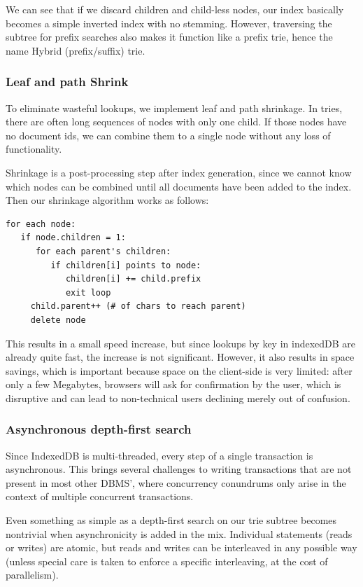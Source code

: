 \documentclass{vldb}
\begin{document}
We can see that if we discard children and child-less nodes, our index basically becomes a simple inverted index with no stemming. However, traversing the subtree for prefix searches also makes it function like a prefix trie, hence the name Hybrid (prefix/suffix) trie.

\subsubsection{Leaf and path Shrink}

To eliminate wasteful lookups, we implement leaf and path shrinkage. In tries, there are often long sequences of nodes with only one child. If those nodes have no document ids, we can combine them to a single node without any loss of functionality.

Shrinkage is a post-processing step after index generation, since we cannot know which nodes can be combined until all documents have been added to the index. Then our shrinkage algorithm works as follows:

\begin{verbatim}
for each node: 
   if node.children = 1:
      for each parent's children:
         if children[i] points to node:
     	    children[i] += child.prefix
     	    exit loop
     child.parent++ (# of chars to reach parent)
     delete node
\end{verbatim}

This results in a small speed increase, but since lookups by key in indexedDB are already quite fast, the increase is not significant. However, it also results in space savings, which is important because space on the client-side is very limited: after only a few Megabytes, browsers will ask for confirmation by the user, which is disruptive and can lead to non-technical users declining merely out of confusion.

\subsubsection{Asynchronous depth-first search}

Since IndexedDB is multi-threaded, every step of a single transaction is asynchronous. This brings several challenges to writing transactions that are not present in most other DBMS', where concurrency conundrums only arise in the context of multiple concurrent transactions.

Even something as simple as a depth-first search on our trie subtree becomes nontrivial when asynchronicity is added in the mix. Individual statements (reads or writes) are atomic, but reads and writes can be interleaved in any possible way (unless special care is taken to enforce a specific interleaving, at the cost of parallelism).
\end{document}
